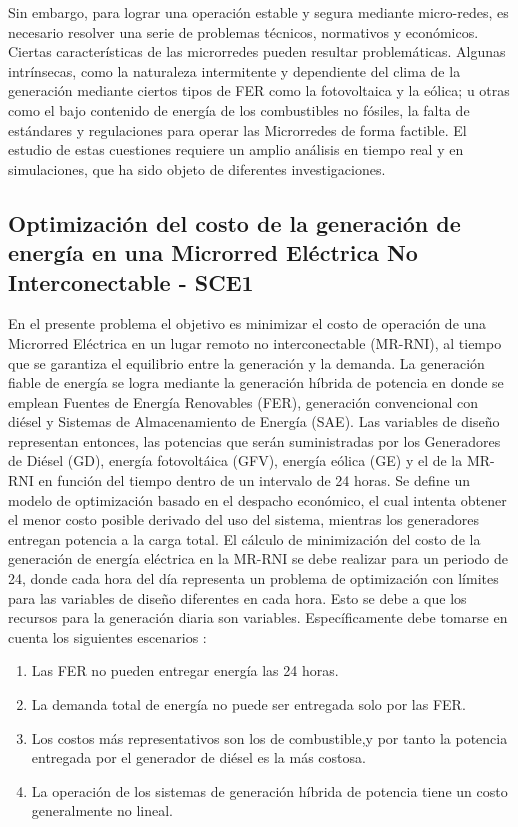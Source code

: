 Sin embargo, para lograr una operación estable y segura mediante micro-redes, es necesario resolver una serie de problemas técnicos, normativos y económicos. Ciertas características de las microrredes pueden resultar problemáticas. Algunas intrínsecas, como la naturaleza intermitente y dependiente del clima de la generación mediante ciertos tipos de FER como la fotovoltaica y la eólica; u otras como el bajo contenido de energía de los combustibles no fósiles, la falta de estándares y regulaciones para operar las Microrredes de forma factible. El estudio de estas cuestiones requiere un amplio análisis en tiempo real y en simulaciones, que ha sido objeto de diferentes investigaciones.

 \subsection{Optimización del costo de la generación de energía en una Microrred Eléctrica No Interconectable - SCE1}
En el presente problema el objetivo es minimizar el costo de operación de una  Microrred Eléctrica en un lugar remoto no interconectable (MR-RNI), al tiempo que se garantiza el equilibrio entre la generación y la demanda. La generación fiable de energía se logra mediante la generación híbrida de potencia en donde se emplean Fuentes de Energía Renovables (FER), generación convencional con diésel y Sistemas de Almacenamiento de Energía (SAE). Las variables de diseño representan entonces, las potencias que serán suministradas por los Generadores de Diésel (GD), energía fotovoltáica (GFV), energía eólica (GE) y el  de la MR-RNI en función del tiempo dentro de un intervalo de 24 horas. Se define un modelo de optimización basado en el despacho económico, el cual intenta obtener el menor costo posible derivado del uso del sistema, mientras los generadores entregan potencia a la carga total. El cálculo de minimización del costo de la generación de energía  eléctrica en la MR-RNI se debe realizar para un periodo de 24, donde cada hora del día representa un problema de optimización con límites para las variables de diseño diferentes en cada hora. Esto se debe a que los recursos para la generación diaria son variables. Específicamente debe tomarse en cuenta los siguientes escenarios \cite{zapata_zapata_control_2017}: 
\begin{enumerate}
\item Las FER no pueden entregar energía las 24 horas.
\item La demanda total de energía no puede ser entregada solo por las FER.
\item Los costos más representativos son los de combustible,y por tanto la potencia entregada por el generador de diésel es la más costosa.
\item La operación de los sistemas de generación híbrida de potencia tiene un costo generalmente no lineal.
\end{enumerate}
